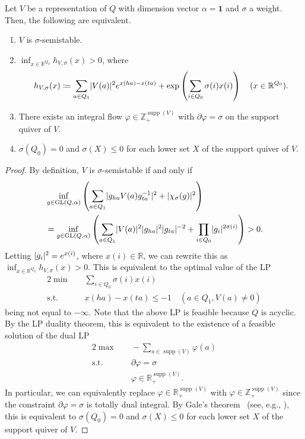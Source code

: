 \documentclass[a4paper,11pt]{article}
\numberwithin{equation}{section}
\newcommand{\R}{\mathbb{R}}
\newcommand{\Z}{\mathbb{Z}}
\newcommand{\ones}{\mathbf{1}}
\DeclareMathOperator{\GL}{GL}
\DeclareMathOperator{\supp}{supp}
\DeclarePairedDelimiter{\abs}{\lvert}{\rvert}
\begin{document}
\begin{lemma}\label{lem:1d-King}
    Let $V$ be a representation of $Q$ with dimension vector $\alpha = \ones$ and $\sigma$ a weight.
    Then, the following are equivalent.
    \begin{enumerate}[{label={\textup{(\arabic*)}}}]
        \item $V$ is $\sigma$-semistable.
        \item $\inf_{x \in \R^{Q_0}} h_{V, \sigma}(x) > 0$, where
            \begin{align}\label{def:f_V}
               h_{V, \sigma}(x) \coloneqq \sum_{a \in Q_1} \abs{V(a)}^2 e^{x(ha) - x(ta)} + \exp\left(\sum_{i \in Q_0}\sigma(i)x(i) \right) \quad (x \in \R^{Q_0}).
            \end{align}
        \item There exists an integral flow $\varphi \in \Z_+^{\supp(V)}$ with $\partial\varphi = \sigma$ on the support quiver of $V$.
        \item $\sigma(Q_0)=0$ and $\sigma(X) \leq 0$ for each lower set $X$ of the support quiver of $V$.
    \end{enumerate}
\end{lemma}
\begin{proof}
    By definition, $V$ is $\sigma$-semistable if and only if
    \begin{align}
    &\inf_{g \in \GL(Q, \alpha)} \left(\sum_{a \in Q_1} \abs{g_{ha}V(a)g_{ta}^{-1}}^2 + \abs{\chi_\sigma(g)}^2 \right) \\
    &= \inf_{g \in \GL(Q, \alpha)} \left(\sum_{a \in Q_1} \abs{V(a)}^2 \abs{g_{ha}}^2 \abs{g_{ta}}^{-2} + \prod_{i \in Q_0}\abs{g_i}^{2\sigma(i)} \right) > 0.
    \end{align}
    Letting $\abs{g_i}^2 = e^{x(i)}$, where $x(i) \in \R$, we can rewrite this as $\inf_{x \in \R^{Q_0}} h_{V, \sigma}(x) > 0$.
    This is equivalent to the optimal value of the LP
    \begin{alignat}{2}
        \min & \quad \sum_{i \in Q_0} \sigma(i) x(i) \\
        \text{s.t.} & \quad x(ha) - x(ta) \leq -1 \quad (a \in Q_1, V(a) \neq 0)
    \end{alignat}
    being not equal to $-\infty$.
    Note that the above LP is feasible because $Q$ is acyclic.
    By the LP duality theorem, this is equivalent to the existence of a feasible solution of the dual LP
    \begin{alignat}{2}
        \max & \quad - \sum_{a \in \supp(V)} \varphi(a) \\
        \text{s.t.} & \quad \partial \varphi = \sigma \\
        & \quad \varphi \in \R_+^{\supp(V)}.
    \end{alignat}
    In particular, we can equivalently replace $\varphi \in \R_+^{\supp(V)}$ with $\varphi \in \Z_+^{\supp(V)}$ since the constraint $\partial\varphi = \sigma$ is totally dual integral.
    By Gale's theorem~\cite{Gale1957} (see, e.g., \cite[Theorem~9.2]{KorteVygen2018}), this is equivalent to $\sigma(Q_0)=0$ and $\sigma(X) \leq 0$ for each lower set $X$ of the support quiver of $V$.
\end{proof}
\end{document}
